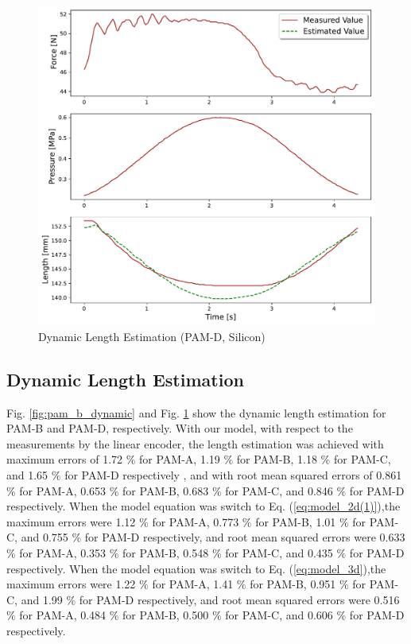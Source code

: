 \begin{figure}[h]
\begin{center}
\begin{minipage}[t]{\columnwidth}
           \includegraphics[keepaspectratio, width=\columnwidth]{fig/20231220_2_s_by_2_2d_ieeesensors2.pdf}
           \caption{Dynamic Length Estimation (PAM-D, Silicon)}
           \label{fig:pam_d_dynamic}
       \end{minipage}
   \end{center}
\end{figure}

\subsection{Dynamic Length Estimation} 
Fig. \ref{fig:pam_b_dynamic} and Fig. \ref{fig:pam_d_dynamic} show the dynamic length estimation for PAM-B and PAM-D, respectively.
With our model, with respect to the measurements by the linear encoder, the length estimation was achieved with maximum errors of 1.72 $\%$ for PAM-A, 1.19 $\%$ for PAM-B, 1.18 $\%$ for PAM-C, and  1.65 $\%$ for PAM-D respectively , and with root mean squared errors of 0.861 $\%$ for PAM-A, 0.653 $\%$ for PAM-B, 0.683 $\%$ for PAM-C, and 0.846 $\%$ for PAM-D respectively. When the model equation was switch to Eq. (\ref{eq:model_2d(1)}),the maximum errors were 1.12 $\%$ for PAM-A, 0.773 $\%$ for PAM-B, 1.01 $\%$ for PAM-C, and 0.755 $\%$ for PAM-D respectively, and root mean squared errors were 0.633 $\%$ for PAM-A, 0.353 $\%$ for PAM-B, 0.548 $\%$ for PAM-C, and 0.435 $\%$ for PAM-D respectively. When the model equation was switch to Eq. (\ref{eq:model_3d}),the maximum errors were 1.22 $\%$ for PAM-A, 1.41 $\%$ for PAM-B, 0.951 $\%$ for PAM-C, and 1.99 $\%$ for PAM-D respectively, and root mean squared errors were 0.516 $\%$ for PAM-A, 0.484 $\%$ for PAM-B, 0.500 $\%$ for PAM-C, and 0.606 $\%$ for PAM-D respectively. 

